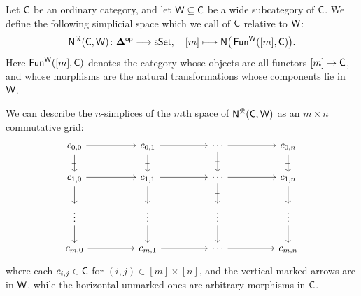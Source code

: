 \begin{definition}
    \label{ch2:: def: rezk nerve}
    Let $\mathsf C$ be an ordinary category, and let $\mathsf W \subseteq \mathsf C$ be a wide subcategory of $\mathsf C$. We define the following simplicial space which we call  of $\mathsf C$ relative to $\mathsf W$: 
    \begin{equation}
        \mathsf N^{\mathcal R}(\mathsf C,\mathsf W) \colon \mathbf\Delta^{\mathsf{op}} \longrightarrow \operatorname{\sf sSet},\quad [m] \longmapsto \mathsf N\big(\operatorname{\sf Fun}^{\mathsf W}([m],\mathsf C) \big).
    \end{equation} 
    Here $\operatorname{\sf Fun}^{\mathsf W}([m],\mathsf C)$ denotes the category whose objects are all
    functors $[m]\to \mathsf C$, and whose morphisms are the natural transformations
    whose components lie in $\mathsf W$.
\end{definition}

\begin{remark}
    We can describe the $n$-simplices of the $m$th space of $\mathsf N^{\mathcal R}(\mathsf C,\mathsf W)$ as an $m\times n$ commutative grid:
    \begin{equation}
       \begin{tikzcd}[ampersand replacement=\&]
        {c_{0,0}} \&\& {c_{0,1}} \&\& \cdots \&\& {c_{0,n}} \\
        {c_{1,0}} \&\& {c_{1,1}} \&\& \cdots \&\& {c_{1,n}} \\
        \vdots \&\& \vdots \&\& \vdots \&\& \vdots \\
        {c_{m,0}} \&\& {c_{m,1}} \&\& \cdots \&\& {c_{m,n}}
        \arrow[from=1-1, to=1-3]
        \arrow["\shortmid"{marking}, from=1-1, to=2-1]
        \arrow[from=1-3, to=1-5]
        \arrow["\shortmid"{marking}, from=1-3, to=2-3]
        \arrow[from=1-5, to=1-7]
        \arrow["\shortmid"{marking}, from=1-5, to=2-5]
        \arrow["\shortmid"{marking}, from=1-7, to=2-7]
        \arrow[from=2-1, to=2-3]
        \arrow["\shortmid"{marking}, from=2-1, to=3-1]
        \arrow[from=2-3, to=2-5]
        \arrow["\shortmid"{marking}, from=2-3, to=3-3]
        \arrow[from=2-5, to=2-7]
        \arrow["\shortmid"{marking}, from=2-5, to=3-5]
        \arrow["\shortmid"{marking}, from=2-7, to=3-7]
        \arrow["\shortmid"{marking}, from=3-1, to=4-1]
        \arrow["\shortmid"{marking}, from=3-3, to=4-3]
        \arrow["\shortmid"{marking}, from=3-5, to=4-5]
        \arrow["\shortmid"{marking}, from=3-7, to=4-7]
        \arrow[from=4-1, to=4-3]
        \arrow[from=4-3, to=4-5]
        \arrow[from=4-5, to=4-7]
    \end{tikzcd} 
    \end{equation}
    where each $c_{i,j} \in \mathsf C$ for $(i,j)\in [m] \times [n]$, and the vertical marked arrows are in $\mathsf W$, while the horizontal unmarked ones are arbitrary morphisms in $\mathsf C$.
\end{remark}


